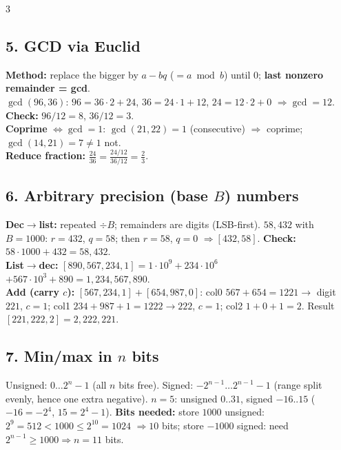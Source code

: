 \documentclass[9pt]{extarticle}
\newcommand{\hl}[1]{\textbf{\textcolor{BrickRed}{#1}}}
\begin{document}
\begin{multicols}{3}
\subsection{5. GCD via Euclid}
\begin{sloppypar}\raggedright
\textbf{Method:} replace the bigger by $a{-}bq$ ($=a\bmod b$) until $0$; \hl{last nonzero remainder = gcd}.\\
$\gcd(96,36)$: $96{=}36{\cdot}2{+}24$, $36{=}24{\cdot}1{+}12$, $24{=}12{\cdot}2{+}0$ $\Rightarrow\gcd{=}12$. \hl{Check:} $96/12{=}8$, $36/12{=}3$.\\
\textbf{Coprime} $\iff\gcd{=}1$: $\gcd(21,22){=}1$ (consecutive) $\Rightarrow$ coprime; $\gcd(14,21){=}7\ne1$ not.\\
\textbf{Reduce fraction:} $\frac{24}{36}=\frac{24/12}{36/12}=\frac23$.
\end{sloppypar}

\subsection{6. Arbitrary precision (base $B$) numbers}
\begin{sloppypar}\raggedright
\textbf{Dec$\to$list:} repeated $\div B$; remainders are digits (LSB-first). $58{,}432$ with $B{=}1000$: $r{=}432$, $q{=}58$; then $r{=}58$, $q{=}0$ $\Rightarrow[432,58]$. \hl{Check:} $58{\cdot}1000{+}432{=}58{,}432$.\\
\textbf{List$\to$dec:} $[890,567,234,1]{=}1{\cdot}10^9{+}234{\cdot}10^6$ \ \ $+567{\cdot}10^3{+}890{=}1{,}234{,}567{,}890$.\\
\textbf{Add (carry $c$):} $[567,234,1]+[654,987,0]$: col0 $567{+}654{=}1221\to$ digit $221$, $c{=}1$; col1 $234{+}987{+}1{=}1222\to222$, $c{=}1$; col2 $1{+}0{+}1{=}2$. Result $[221,222,2]{=}2{,}222{,}221$.
\end{sloppypar}

\subsection{7. Min/max in $n$ bits}
Unsigned: $0\ldots2^n{-}1$ (all $n$ bits free). Signed: $-2^{n-1}\ldots2^{n-1}{-}1$ (range split evenly, hence one extra negative). $n{=}5$: unsigned $0..31$, signed $-16..15$ ($-16{=}{-}2^4$, $15{=}2^4{-}1$). \hl{Bits needed:} store $1000$ unsigned: $2^9{=}512<1000\le2^{10}{=}1024$ $\Rightarrow10$ bits; store $-1000$ signed: need $2^{n-1}\ge1000\Rightarrow n{=}11$ bits.


\end{multicols}
\end{document}

